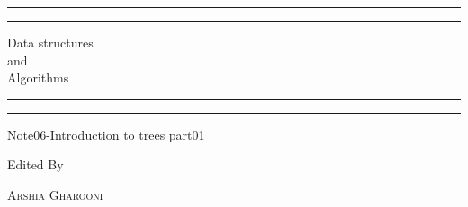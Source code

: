 \documentclass[a4paper, 11pt, oneside]{book} %
\begin{document}
 

\begin{titlepage} %

	\centering %
	
	\scshape %
	
	\vspace*{\baselineskip} %
	
	
	\rule{\textwidth}{1.6pt}\vspace*{-\baselineskip}\vspace*{2pt} %
	\rule{\textwidth}{0.4pt} %
	
	\vspace{0.75\baselineskip} %
	
	{\LARGE Data structures\\ and\\ Algorithms\\} %
	
	\vspace{0.75\baselineskip} %
	
	\rule{\textwidth}{0.4pt}\vspace*{-\baselineskip}\vspace{3.2pt} %
	\rule{\textwidth}{1.6pt} %
	
	\vspace{2\baselineskip} %
	
	
	Note06-Introduction to trees part01%
	
	\vspace*{3\baselineskip} %
	
	
	Edited By
	
	\vspace{0.5\baselineskip} %
	
	{\scshape\Large Arshia Gharooni \\} %
	

\end{titlepage}
\end{document}
